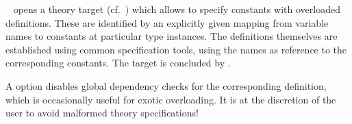 \begin{isabellebody}
\begin{isamarkuptext}
\begin{description}
  \item \hyperlink{command.overloading}{\mbox{}}~
  opens a theory target (cf.\ ) which allows to
  specify constants with overloaded definitions.  These are identified
  by an explicitly given mapping from variable names  to
  constants  at particular type instances.  The
  definitions themselves are established using common specification
  tools, using the names  as reference to the
  corresponding constants.  The target is concluded by \hyperlink{command.local.end}{\mbox{}}.

  A  option disables global dependency checks for
  the corresponding definition, which is occasionally useful for
  exotic overloading.  It is at the discretion of the user to avoid
  malformed theory specifications!


\end{description}
\end{isamarkuptext}
\end{isabellebody}
